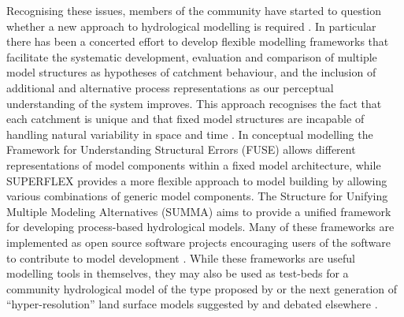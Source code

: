 \documentclass{icldt}\usepackage[]{graphicx}\usepackage[]{color}
\begin{document}
Recognising these issues, members of the community have started to question whether a new approach to hydrological modelling is required \citep[e.g.][]{sivapalan2009,savenije2009}. In particular there has been a concerted effort to develop flexible modelling frameworks that facilitate the systematic development, evaluation and comparison of multiple model structures as hypotheses of catchment behaviour, and the inclusion of additional and alternative process representations as our perceptual understanding of the system improves. This approach recognises the fact that each catchment is unique and that fixed model structures are incapable of handling natural variability in space and time \citep{beven2000}. In conceptual modelling the Framework for Understanding Structural Errors (FUSE) \citet{clark2008} allows different representations of model components within a fixed model architecture, while SUPERFLEX \citep{fenicia2011,kavetski2011} provides a more flexible approach to model building by allowing various combinations of generic model components. The Structure for Unifying Multiple Modeling Alternatives (SUMMA) \citep{clark2015-b,clark2015-a} aims to provide a unified framework for developing process-based hydrological models. Many of these frameworks are implemented as open source software projects encouraging users of the software to contribute to model development \citep{clark2015-b}. While these frameworks are useful modelling tools in themselves, they may also be used as test-beds for a community hydrological model of the type proposed by \citet{weiler2015} or the next generation of ``hyper-resolution'' land surface models suggested by \citet{wood2011} and debated elsewhere \citep{beven2012,wood2012,nazemi2015}. \\

\end{document}
